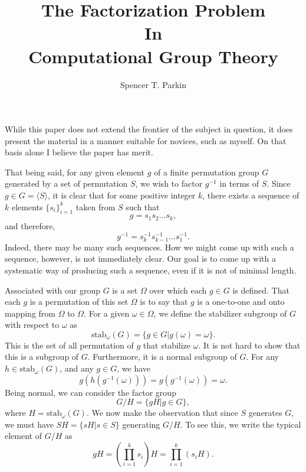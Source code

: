 \documentclass[12pt]{article}
\title{The Factorization Problem\\In\\Computational Group Theory}
\author{Spencer T. Parkin}
\newcommand{\stab}{\mbox{stab}}
\begin{document}
\maketitle

While this paper does not extend the frontier of the subject in question, it does
present the material in a manner suitable for novices, such as myself.  On that basis
alone I believe the paper has merit.

That being said, for any given element $g$ of a finite permutation group $G$ generated
by a set of permutation $S$, we wish to factor $g^{-1}$ in terms of $S$.
Since $g\in G=\langle S\rangle$, it is clear that for some positive integer $k$, there exists
a sequence of $k$ elements $\{s_i\}_{i=1}^k$ taken from $S$ such that
\begin{equation*}
g = s_1s_2\dots s_k,
\end{equation*}
and therefore,
\begin{equation*}
g^{-1} = s_k^{-1}s_{k-1}^{-1}\dots s_1^{-1}.
\end{equation*}
Indeed, there may be many such sequences.
How we might come up with such a sequence, however, is not immediately clear.
Our goal is to come up with a systematic way of producing such a sequence, even if it
is not of minimal length.

Associated with our group $G$ is a set $\Omega$ over which each $g\in G$ is defined.
That each $g$ is a permutation of this set $\Omega$ is to say that $g$ is a one-to-one and onto
mapping from $\Omega$ to $\Omega$.
For a given $\omega\in\Omega$,
we define the stabilizer subgroup of $G$ with respect to $\omega$ as
\begin{equation*}
\stab_{\omega}(G) = \{g\in G|g(\omega)=\omega\}.
\end{equation*}
This is the set of all permutation of $g$ that stabilize $\omega$.  It is not hard to show
that this is a subgroup of $G$.  Furthermore, it is a normal subgroup of $G$.  For any $h\in\stab_{\omega}(G)$,
and any $g\in G$, we have
\begin{equation*}
g(h(g^{-1}(\omega))) = g(g^{-1}(\omega)) = \omega.
\end{equation*}
Being normal, we can consider the factor group
\begin{equation*}
G/H = \{gH|g\in G\},
\end{equation*}
where $H=\stab_{\omega}(G)$.  We now make the observation that since $S$
generates $G$, we must have $SH=\{sH|s\in S\}$ generating $G/H$.  To see this, we write
the typical element of $G/H$ as
\begin{equation*}
gH = \left(\prod_{i=1}^k s_i\right)H = \prod_{i=1}^k (s_iH).
\end{equation*}
\end{document}
